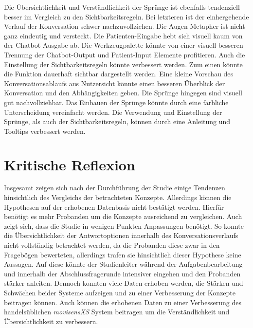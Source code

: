 Die Übersichtlichkeit und Verständlichkeit der Sprünge ist ebenfalls tendenziell besser im Vergleich zu den Sichtbarkeitsregeln. Bei letzteren ist der einhergehende Verlauf der Konversation schwer nachzuvollziehen. Die Augen-Metapher ist nicht ganz eindeutig und versteckt. Die Patienten-Eingabe hebt sich visuell kaum von der Chatbot-Ausgabe ab. Die Werkzeugpalette könnte von einer visuell besseren Trennung der Chatbot-Output und Patient-Input Elemente profitieren. Auch die Einstellung der Sichtbarkeitsregeln könnte verbessert werden. Zum einen könnte die Funktion dauerhaft sichtbar dargestellt werden. Eine kleine Vorschau des Konversationsablaufs aus Nutzersicht könnte einen besseren Überblick der Konversation und den Abhängigkeiten geben. Die Sprünge hingegen sind visuell gut nachvollziehbar. Das Einbauen der Sprünge könnte durch eine farbliche Unterscheidung vereinfacht werden. Die Verwendung und Einstellung der Sprünge, als auch der Sichtbarkeitsregeln, können durch eine Anleitung und Tooltips verbessert werden.


\section{Kritische Reflexion}
Insgesamt zeigen sich nach der Durchführung der Studie einige Tendenzen hinsichtlich des Vergleichs der betrachteten Konzepte. Allerdings können die Hypothesen auf der erhobenen Datenbasis nicht bestätigt werden. Hierfür benötigt es mehr Probanden um die Konzepte ausreichend zu vergleichen. Auch zeigt sich, dass die Studie in wenigen Punkten Anpassungen benötigt. So konnte die Übersichtlichkeit der Antwortoptionen innerhalb des Konversationsverlaufs nicht vollständig betrachtet werden, da die Probanden diese zwar in den Fragebögen bewerteten, allerdings trafen sie hinsichtlich dieser Hypothese keine Aussagen. Auf diese könnte der Studienleiter während der Aufgabenbearbeitung und innerhalb der Abschlussfragerunde intensiver eingehen und den Probanden stärker anleiten. Dennoch konnten viele Daten erhoben werden, die Stärken und Schwächen beider Systeme aufzeigen und zu einer Verbesserung der Konzepte beitragen können. Auch können die erhobenen Daten zu einer Verbesserung des handelsüblichen \emph{movisensXS} System beitragen um die Verständlichkeit und Übersichtlichkeit zu verbessern. 

